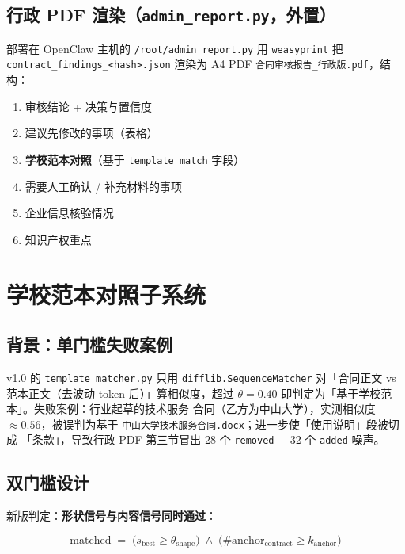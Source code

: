\documentclass[11pt,a4paper]{article}
\begin{document}
\subsection{行政 PDF 渲染（\texttt{admin\_report.py}，外置）}

部署在 OpenClaw 主机的 \texttt{/root/admin\_report.py} 用
\texttt{weasyprint} 把 \texttt{contract\_findings\_<hash>.json}
渲染为 A4 PDF \texttt{合同审核报告\_行政版.pdf}，结构：

\begin{enumerate}[leftmargin=1.4em,itemsep=1pt]
  \item 审核结论 + 决策与置信度
  \item 建议先修改的事项（表格）
  \item \textbf{学校范本对照}（基于 \texttt{template\_match} 字段）
  \item 需要人工确认 / 补充材料的事项
  \item 企业信息核验情况
  \item 知识产权重点
\end{enumerate}

\section{学校范本对照子系统}

\subsection{背景：单门槛失败案例}

v1.0 的 \texttt{template\_matcher.py} 只用 \texttt{difflib.SequenceMatcher}
对「合同正文 vs 范本正文（去波动 token 后）」算相似度，超过
$\theta=0.40$ 即判定为「基于学校范本」。失败案例：行业起草的技术服务
合同（乙方为中山大学），实测相似度 $\approx 0.56$，被误判为基于
\texttt{中山大学技术服务合同.docx}；进一步使「使用说明」段被切成
「条款」，导致行政 PDF 第三节冒出 28 个 \texttt{removed} + 32 个
\texttt{added} 噪声。

\subsection{双门槛设计}

新版判定：\textbf{形状信号与内容信号同时通过}：

\begin{equation}\label{eq:gate}
\text{matched} \;=\;
\bigl(s_\text{best} \ge \theta_\text{shape}\bigr)
\;\wedge\;
\bigl(\#\text{anchor}_\text{contract} \ge k_\text{anchor}\bigr)
\end{equation}
\end{document}
